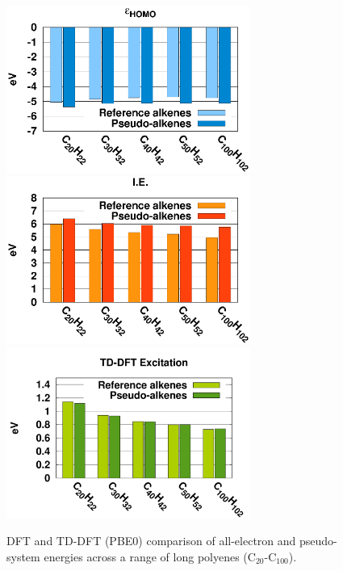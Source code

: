 \documentclass[12pt]{article}
\begin{document}
\begin{figure}
\begin{center}
\includegraphics[width=8cm]{long_pbe0_homo_uhf}
\includegraphics[width=8cm]{long_pbe0_ie_uhf}
\includegraphics[width=8cm]{long_pbe0_tddft}
\end{center}
\vspace{0.25in}
\hspace*{3in}

\caption{DFT and TD-DFT (PBE0) comparison of all-electron and pseudo-system energies across a range of long polyenes (C\(_{20}\)-C\(_{100}\)).}
\label{fig:long_chain_graphs}
\end{figure}
\end{document}
